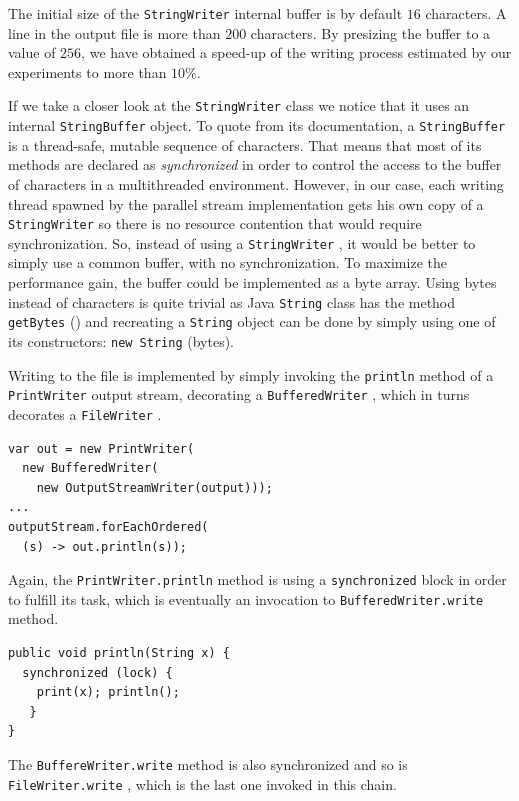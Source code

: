 \documentclass[a4paper,twoside]{article}
\begin{document}
The initial size of the {\texttt{StringWriter} } internal buffer is by default $16$ characters.
A line in the output file is more than $200$ characters.
By presizing the buffer to a value of $256$, we have obtained a speed-up of the writing process estimated by our experiments to more than $10\%$.

If we take a closer look at the {\texttt{StringWriter} } class we notice that it uses an internal {\texttt{StringBuffer} } object.
To quote from its documentation, a {\texttt{StringBuffer} } is  a thread-safe, mutable sequence of characters.
That means that most of its methods are declared as {\textit{synchronized} } in order to control the access to the buffer of characters in a multithreaded environment.
However, in our case, each writing thread spawned by the parallel stream implementation gets his own copy of a {\texttt{StringWriter} } so there is no resource contention that would require synchronization.
So, instead of using a {\texttt{StringWriter} }, it would be better to simply use a common buffer, with no synchronization.
To maximize the performance gain, the buffer could be implemented as a byte array.
Using bytes instead of characters is quite trivial as Java {\texttt{String} } class has the method {\texttt{getBytes} ()} and recreating a {\texttt{String} } object can be done by simply using one of its constructors: {\texttt{new String} (bytes)}.

Writing to the file is implemented by simply invoking the {\texttt{println} } method of a {\texttt{PrintWriter} } output stream, decorating a {\texttt{BufferedWriter} }, which in turns decorates a {\texttt{FileWriter} }.
\begin{verbatim}
var out = new PrintWriter(
  new BufferedWriter(
    new OutputStreamWriter(output)));
...    
outputStream.forEachOrdered(
  (s) -> out.println(s));
\end{verbatim}

Again, the {\texttt{PrintWriter.println} } method is using a {\texttt{synchronized} } block in order to fulfill its task, which is eventually an invocation to {\texttt{BufferedWriter.write} } method.
\begin{verbatim}
public void println(String x) {
  synchronized (lock) {
    print(x); println();
   }
}
\end{verbatim}
The {\texttt{BuffereWriter.write} } method is also synchronized and so is {\texttt{FileWriter.write} }, which is the last one invoked in this chain.
\end{document}
